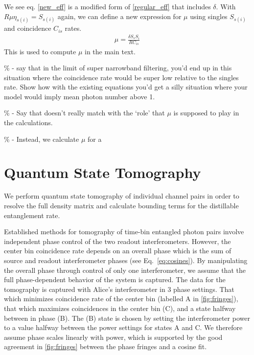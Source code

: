 \documentclass[11pt]{caltech_thesis} %
\begin{document}
We see eq. \ref{new_eff} is a modified form of \ref{regular_eff} that includes $\delta$. With $R \mu \eta_{s(i)}=S_{s(i)}$ again, we can define a new expression for $\mu$ using singles $S_{s(i)}$ and coincidence $C_{is}$ rates.
\begin{align}
    \mu = \frac{\delta S_s S_i }{R C_{is}} \label{new_mu}
\end{align}
This is used to compute $\mu$ in the main text.

\% - say that in the limit of super narrowband filtering, you'd end up in this situation where the coincidence rate would be super low relative to the singles rate. Show how with the existing equations you'd get a silly situation where your model would imply mean photon number above 1.

\% - Say that doesn't really match with the `role' that $\mu$ is supposed to play in the calculations.

\% - Instead, we calculate $\mu$ for a

\hypertarget{quantum-state-tomography}{%
\section{Quantum State Tomography}\label{quantum-state-tomography}}

We perform quantum state tomography of individual channel pairs in order to resolve the full density matrix and calculate bounding terms for the distillable entanglement rate.

Established methods for tomography of time-bin entangled photon pairs involve independent phase control of the two readout interferometers. However, the center bin coincidence rate depends on an overall phase which is the sum of source and readout interferometer phases (see Eq.~\ref{eq:cosines}). By manipulating the overall phase through control of only one interferometer, we assume that the full phase-dependent behavior of the system is captured. The data for the tomography is captured with Alice's interferometer in 3 phase settings. That which minimizes coincidence rate of the center bin (labelled A in \ref{fig:fringes}), that which maximizes coincidences in the center bin (C), and a state halfway between in phase (B). The (B) state is chosen by setting the interferometer power to a value halfway between the power settings for states A and C. We therefore assume phase scales linearly with power, which is supported by the good agreement in \ref{fig:fringes} between the phase fringes and a cosine fit.
\end{document}
